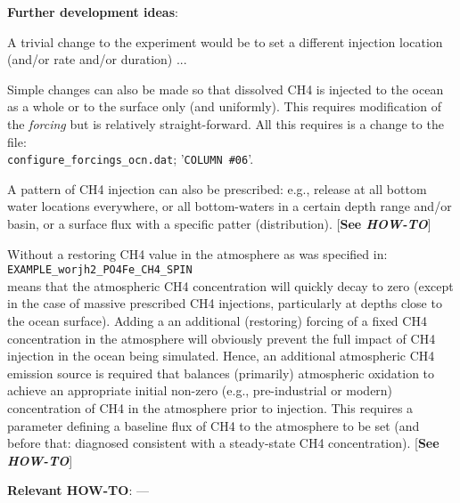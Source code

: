 \documentclass[10pt,twoside]{article}
\begin{document}
\noindent \textbf{Further development ideas}:
\begin{compactenum}
        \item A trivial change to the experiment would be to set a different injection location (and/or rate and/or duration) ...
                \item Simple changes can also be made so that dissolved CH4 is injected to the ocean as a whole or to the surface only (and uniformly). This requires modification of the \textit{forcing} but is relatively straight-forward. All this requires is a change to the file:
                \\ \texttt{configure\_forcings\_ocn.dat}; '\texttt{COLUMN \#06}'.
                                \item A pattern of CH4 injection can also be prescribed: e.g., release at all bottom water locations everywhere, or all bottom-waters in a certain depth range and/or basin, or a surface flux with a specific patter (distribution). [\textbf{See \textit{HOW-TO}}]
                                \item Without a restoring CH4 value in the atmosphere as was specified in:
                                \\\texttt{EXAMPLE\_worjh2\_PO4Fe\_CH4\_SPIN}
                                \\means that the atmospheric CH4 concentration will quickly decay to zero (except in the case of massive prescribed CH4 injections, particularly at depths close to the ocean surface). Adding a an additional (restoring) forcing of a fixed CH4 concentration in the atmosphere will obviously prevent the full impact of CH4 injection in the ocean being simulated. Hence, an additional atmospheric CH4 emission source is required that balances (primarily) atmospheric oxidation to achieve an appropriate initial non-zero (e.g., pre-industrial or modern) concentration of CH4 in the atmosphere prior to injection. This requires a parameter defining a baseline flux of CH4 to the atmosphere to be set (and before that: diagnosed consistent with a steady-state CH4 concentration). [\textbf{See \textit{HOW-TO}}]
\end{compactenum}

\noindent \textbf{Relevant HOW-TO}: ---

\end{document}
